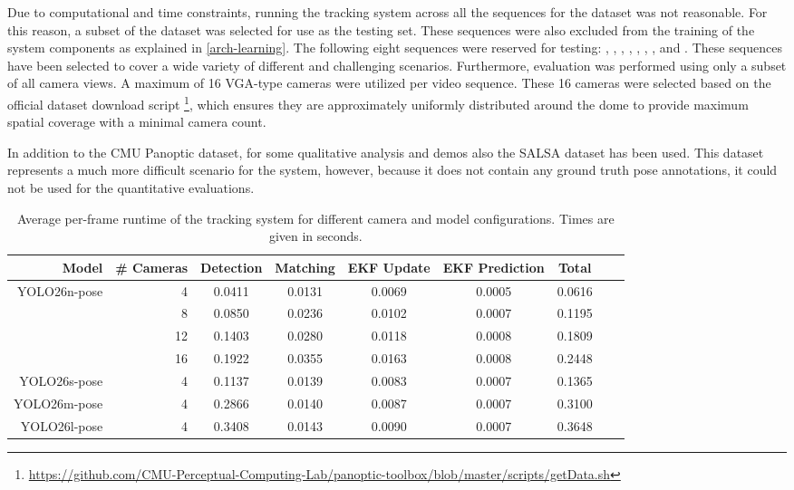 Due to computational and time constraints, running the tracking system across all the sequences for the dataset was not reasonable. For this reason, a subset of the dataset was selected for use as the testing set. These sequences were also excluded from the training of the system components as explained in \cref{arch-learning}. The following eight sequences were reserved for testing: , , , , , , , and . These sequences have been selected to cover a wide variety of different and challenging scenarios. Furthermore, evaluation was performed using only a subset of all camera views. A maximum of 16 VGA-type cameras were utilized per video sequence. These 16 cameras were selected based on the official dataset download script \footnote{\url{https://github.com/CMU-Perceptual-Computing-Lab/panoptic-toolbox/blob/master/scripts/getData.sh}}, which ensures they are approximately uniformly distributed around the dome to provide maximum spatial coverage with a minimal camera count.

In addition to the CMU Panoptic dataset, for some qualitative analysis and demos also the SALSA dataset \parencite{alameda2015salsa} has been used. This dataset represents a much more difficult scenario for the system, however, because it does not contain any ground truth pose annotations, it could not be used for the quantitative evaluations.

\begin{table}[!ht]
  \centering
  \begin{tabular}{|r|r|c|c|c|c|c|c|c|}
  \hline
    Model & \# Cameras & Detection & Matching & EKF Update & EKF Prediction & Total \\ \hline
    \multirow{4}{*}{YOLO26n-pose}  & 4 & 0.0411 & 0.0131 & 0.0069 & 0.0005 & 0.0616 \\ \cline{2-7}
      & 8 & 0.0850 & 0.0236 & 0.0102 & 0.0007 & 0.1195 \\ \cline{2-7}
      & 12 & 0.1403 & 0.0280 & 0.0118 & 0.0008 & 0.1809 \\ \cline{2-7}
      & 16 & 0.1922 & 0.0355  & 0.0163 & 0.0008 & 0.2448 \\ \hline \hline
    YOLO26s-pose & 4 & 0.1137 & 0.0139 & 0.0083 & 0.0007 & 0.1365 \\ \hline
    YOLO26m-pose & 4 & 0.2866 & 0.0140 & 0.0087 & 0.0007 & 0.3100 \\ \hline
    YOLO26l-pose & 4 & 0.3408 & 0.0143 & 0.0090 & 0.0007 & 0.3648 \\ \hline
  \end{tabular}
  \caption{Average per-frame runtime of the tracking system for different camera and model configurations. Times are given in seconds.}
  \label{fig:perf}
\end{table}

